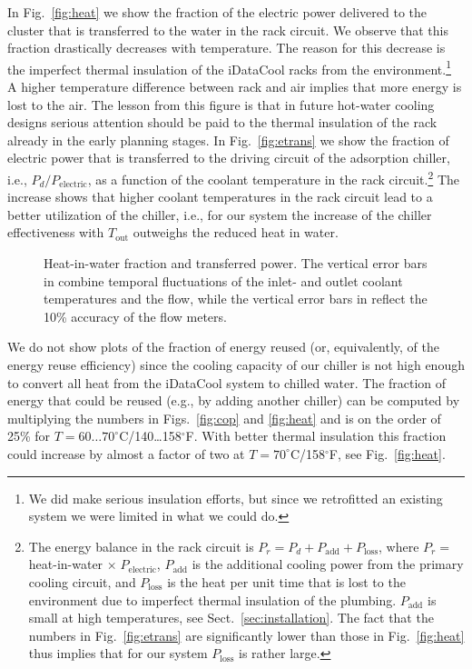 In Fig.~\ref{fig:heat} we show the fraction of the electric power
delivered to the cluster that is transferred to the water in the rack
circuit.  We observe that this fraction drastically decreases with
temperature.  The reason for this decrease is the imperfect thermal
insulation of the iDataCool racks from the environment.\footnote{We
  did make serious insulation efforts, but since we retrofitted an
  existing system we were limited in what we could do.}  A higher
temperature difference between rack and air implies that more energy
is lost to the air.  The lesson from this figure is that in future
hot-water cooling designs serious attention should be paid to the
thermal insulation of the rack already in the early planning stages.
In Fig.~\ref{fig:etrans} we show the fraction of electric power that
is transferred to the driving circuit of the adsorption chiller, i.e.,
$P_d/P_\text{electric}$, as a function of the coolant temperature in
the rack circuit.\footnote{The energy balance in the rack circuit is
  $P_r=P_d+P_\text{add}+P_\text{loss}$, where 
  $P_r =$ heat-in-water $\times\; P_{\text{electric}}$,
  $P_\text{add}$ is the additional cooling power
  from the primary cooling circuit, and $P_\text{loss}$ is the heat
  per unit time that is lost to the environment due to imperfect
  thermal insulation of the plumbing.  $P_\text{add}$ is small at high
  temperatures, see Sect.~\ref{sec:installation}.  The fact that the
  numbers in Fig.~\ref{fig:etrans} are significantly lower than those
  in Fig.~\ref{fig:heat} thus implies that for our system
  $P_\text{loss}$ is rather large.} The increase shows that higher
coolant temperatures in the rack circuit lead to a better utilization
of the chiller, i.e., for our system the increase of the chiller
effectiveness with $T_{\text{out}}$ outweighs the reduced heat in
water.

\begin{figure}[t]
  \centering
  \hfill
  \vspace*{-3mm}
  \caption{ Heat-in-water fraction and
     transferred power.  The vertical error bars in
     combine temporal fluctuations of the inlet- and
    outlet coolant temperatures and the flow, while the vertical error
    bars in  reflect the 10\% accuracy of the flow
    meters.}
\end{figure}


We do not show plots of the fraction of energy reused (or,
equivalently, of the energy reuse efficiency) since the cooling
capacity of our chiller is not high enough to convert all heat
from the iDataCool system to chilled water.  The fraction of energy
that could be reused (e.g., by adding another chiller) can be computed
by multiplying the numbers in Figs.~\ref{fig:cop} and \ref{fig:heat}
and is on the order of 25\% for
$T=60\ldots70^\circ$C/140\ldots158$^\circ$F.  With better thermal
insulation this fraction could increase by almost a factor of two at
$T=70^\circ$C/158$^\circ$F, see Fig.~\ref{fig:heat}.

